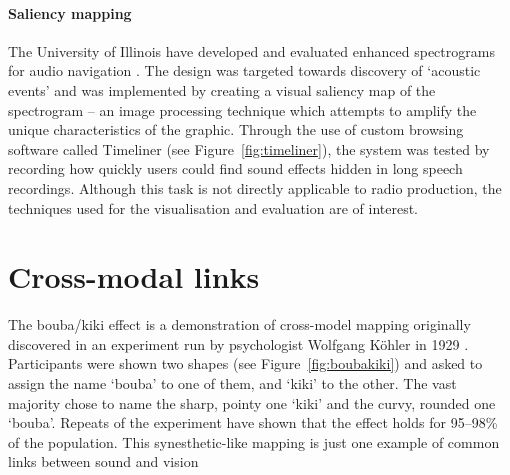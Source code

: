 \paragraph{Saliency mapping}
The University of Illinois have developed and evaluated enhanced spectrograms
for audio navigation \cite{Goudeseune2012,Lin2013}. The design was targeted
towards discovery of `acoustic events' and was implemented by creating a visual
saliency map of the spectrogram -- an image processing technique which attempts
to amplify the unique characteristics of the graphic.  Through the use of
custom browsing software called Timeliner (see Figure~\ref{fig:timeliner}), the
system was tested by recording how quickly users could find sound effects
hidden in long speech recordings. Although this task is not directly
applicable to radio production, the techniques used for the visualisation and
evaluation are of interest.

\section{Cross-modal links}\label{sec:litreviewmodal}
The bouba/kiki effect is a demonstration of cross-model mapping originally
discovered in an experiment run by psychologist Wolfgang K\"{o}hler in 1929
\cite{Koehler1929}. Participants were shown two shapes (see
Figure~\ref{fig:boubakiki}) and asked to assign the name `bouba' to one of
them, and `kiki' to the other. The vast majority chose to name the sharp,
pointy one `kiki' and the curvy, rounded one `bouba'. Repeats of the experiment
\cite{Ramachandran2001} have shown that the effect holds for 95--98\% of the
population. This synesthetic-like mapping \cite{Hubbard1996} is just one
example of common links between sound and vision

